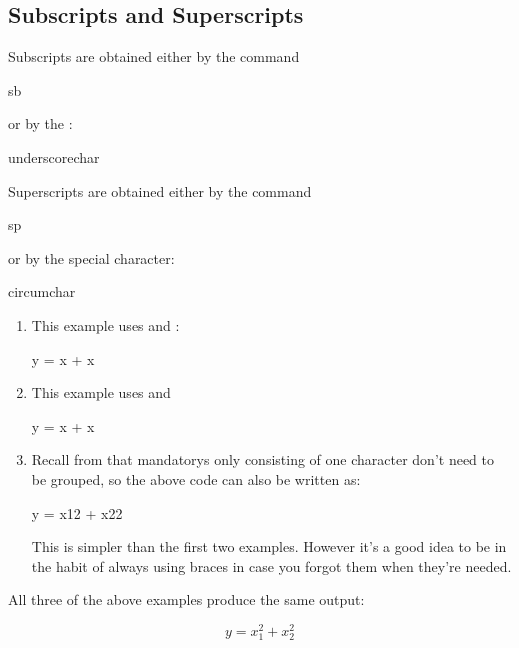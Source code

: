 
\subsection{Subscripts and Superscripts}
\label{sec:scripts}

Subscripts are obtained either by the command
\begin{definition}
\gls{sb}
\end{definition}%
or by the :
\begin{definition}
\gls{underscorechar}
\end{definition}%
Superscripts are obtained either by the command
\begin{definition}
\gls{sp}
\end{definition}%
or by the special character:
\begin{definition}
\gls{circumchar}
\end{definition}%

\begin{enumerate}
\item  This example uses  and :
\begin{codeS}
y = x +
x
\end{codeS}%

\item This example uses  and 
\begin{codeS}
y = x
 + x
\end{codeS}%

\item Recall from 
 that
\glspl{mandatory} only consisting of one
character don't need to be grouped, so the above code can also be
written as:
\begin{codeS}
y = x12 
 + x22
\end{codeS}%
This is simpler than the first two examples. However it's a good idea to be in the
habit of always using braces in case you forgot them when they're
needed.
\end{enumerate}
All three of the above examples produce the same output:
\begin{resultS}
\[y = x_1^2 + x_2^2\]
\end{resultS}%

